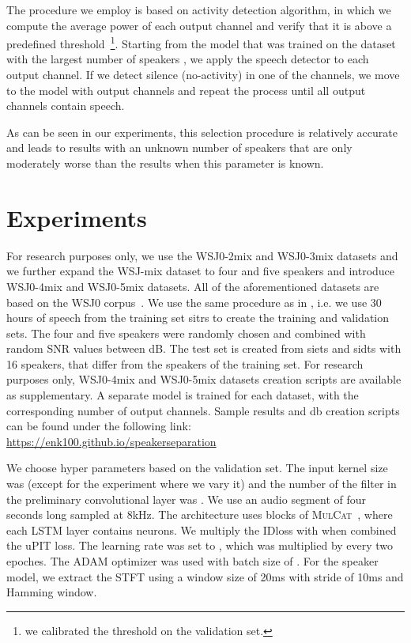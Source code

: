 \documentclass{article}
\newcommand{\ours}{\textsc{MulCat}~}
\begin{document}
The procedure we employ is based on activity detection algorithm, in which we compute the average power of each output channel and verify that it is above a predefined threshold~\footnote{we calibrated the threshold on the validation set.}. Starting from the model that was trained on the dataset with the largest number of speakers , we apply the speech detector to each output channel. If we detect silence (no-activity) in one of the channels, we move to the model with  output channels and repeat the process until all output channels contain speech.

As can be seen in our experiments, this selection procedure is relatively accurate and leads to results with an unknown number of speakers that are only moderately worse than the results when this parameter is known.
 \section{Experiments}
\label{sec:exp}

For research purposes only, we use the WSJ0-2mix and WSJ0-3mix datasets \cite{hershey2016deep} and we further expand the WSJ-mix dataset to four and five speakers and introduce WSJ0-4mix and WSJ0-5mix datasets. All of the aforementioned datasets are based on the WSJ0 corpus~\cite{garofolo1993csr}. We use the same procedure as in \cite{hershey2016deep}, i.e. we use 30 hours of speech from the training set sitrs to create the training and validation sets. The four and five speakers were randomly chosen and combined with random SNR values between  dB. The test set is created from  siets and sidts with 16 speakers, that differ from the speakers of the training set. For research purposes only, WSJ0-4mix and WSJ0-5mix datasets creation scripts are available as supplementary. A separate model is trained for each dataset, with the corresponding number of output channels. Sample results and db creation scripts can be found under the following link: \href{https://enk100.github.io/speaker_separation}{https://enk100.github.io/speakerseparation}

 We choose hyper parameters based on the validation set.  The input kernel size  was  (except for the experiment where we vary it) and the number of the filter in the preliminary convolutional layer was . We use an audio segment of four seconds long sampled at 8kHz. The architecture uses  blocks of \ours, where each LSTM layer contains  neurons. We multiply the IDloss with  when combined the uPIT loss. The learning rate was set to , which was multiplied by  every two epoches. The ADAM optimizer \cite{kingma2014adam} was used with batch size of . For the speaker model, we extract the STFT using a window size of 20ms with stride of 10ms and Hamming window.
\end{document}

